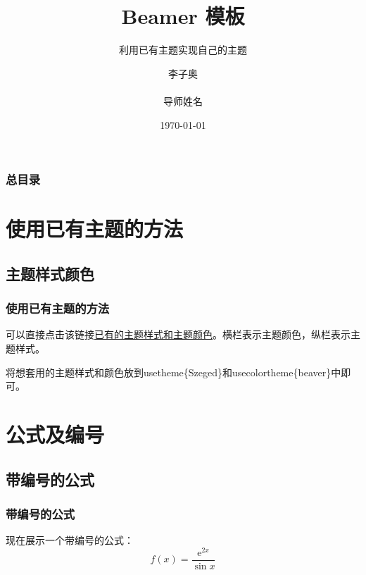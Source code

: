 \documentclass[aspectratio=169, 10pt, utf8, mathserif]{beamer}
\begin{document}

\title{Beamer 模板}
\subtitle{利用已有主题实现自己的主题}
\author[姓名]{李子奥 \\ 
   \quad \\ \vspace{0.5cm} 导师姓名\quad{}}
\date{\today}
\begin{frame}
    \titlepage
\end{frame}

\begin{frame}
 \frametitle{总目录}
 \begin{multicols}{2}
  \tableofcontents[hideallsubsections]
 \end{multicols}
\end{frame}

\section{使用已有主题的方法}
\subsection{主题样式颜色}
\begin{frame}
 \frametitle{使用已有主题的方法}
可以直接点击该链接\underline{\href{https://mpetroff.net/files/beamer-theme-matrix/}{已有的主题样式和主题颜色}}。横栏表示主题颜色，纵栏表示主题样式。

将想套用的主题样式和颜色放到usetheme\{Szeged\}和usecolortheme\{beaver\}中即可。
\end{frame}

\section{公式及编号}
\subsection{带编号的公式}
\begin{frame}
 \frametitle{带编号的公式}
现在展示一个带编号的公式：
 \begin{equation}
 f(x) = \frac{\mathrm e^{2x}}{\sin x}
 \end{equation}
\end{frame}
\end{document}
